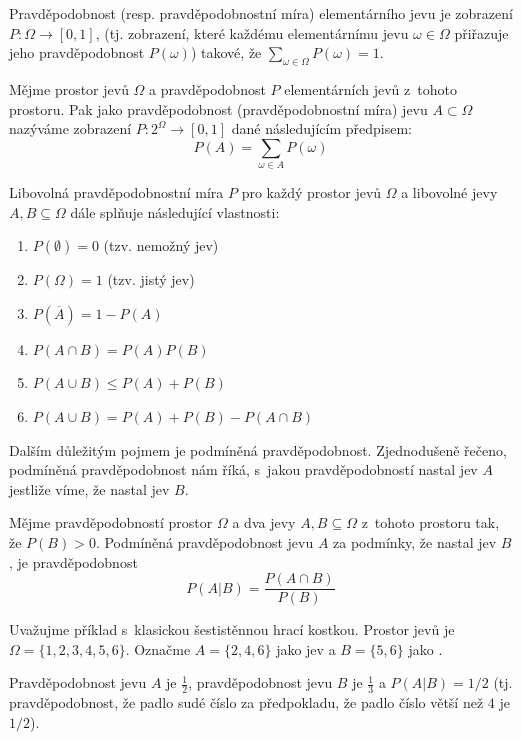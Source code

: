 \begin{definition}
 Pravděpodobnost (resp. pravděpodobnostní míra) elementárního jevu je zobrazení $P: \Omega \rightarrow [0,1]$, (tj. zobrazení, které každému elementárnímu jevu $\omega \in \Omega$ přiřazuje jeho pravděpodobnost $P(\omega)$) takové, že $\sum_{\omega \in \Omega} P(\omega) = 1$.
\end{definition}

\begin{definition}
 Mějme prostor jevů $\Omega$ a pravděpodobnost $P$ elementárních jevů z~tohoto prostoru. Pak jako pravděpodobnost (pravděpodobnostní míra) jevu $A \subset \Omega$ nazýváme zobrazení $P: 2^\Omega \rightarrow [0,1]$ dané následujícím předpisem:
  $$
    P(A) = \sum_{\omega \in A} P(\omega)
  $$
\end{definition}

Libovolná pravděpodobnostní míra $P$ pro každý prostor jevů $\Omega$ a libovolné jevy $A, B \subseteq \Omega$ dále splňuje následující vlastnosti:
\begin{enumerate}
 \item $P(\emptyset) = 0$ (tzv. nemožný jev)
 \item $P(\Omega) = 1$ (tzv. jistý jev)
 \item $P(\overline{A}) = 1 - P(A)$
 \item $P(A \cap B) = P(A) P(B)$
 \item $P(A \cup B) \leq P(A) + P(B)$
 \item $P(A \cup B) = P(A) + P(B) - P(A \cap B)$
\end{enumerate}

Dalším důležitým pojmem je podmíněná pravděpodobnost. Zjednodušeně řečeno, podmíněná pravděpodobnost nám říká, s~jakou pravděpodobností nastal jev $A$ jestliže víme, že nastal jev $B$.

\begin{definition}
 Mějme pravděpodobností prostor $\Omega$ a dva jevy $A, B \subseteq \Omega$ z~tohoto prostoru tak, že $P(B) > 0$. Podmíněná pravděpodobnost jevu $A$ za podmínky, že nastal jev $B$, je pravděpodobnost 
 $$
  P(A | B) = \frac{P(A \cap B)}{P(B)}
 $$
\end{definition}

\begin{example}[Pravděpodobnost]
 Uvažujme příklad s~klasickou šestistěnnou hrací kostkou. Prostor jevů je $\Omega = \{ 1,2,3,4,5,6 \}$. Označme $A = \{2, 4, 6\}$ jako jev  a $B = \{ 5, 6 \}$ jako .
 
 Pravděpodobnost jevu $A$ je $\frac{1}{2}$, pravděpodobnost jevu $B$ je $\frac{1}{3}$ a $P(A | B) = 1 / 2$ (tj. pravděpodobnost, že padlo sudé číslo za předpokladu, že padlo číslo větší než $4$ je $1/2$).
\end{example}



